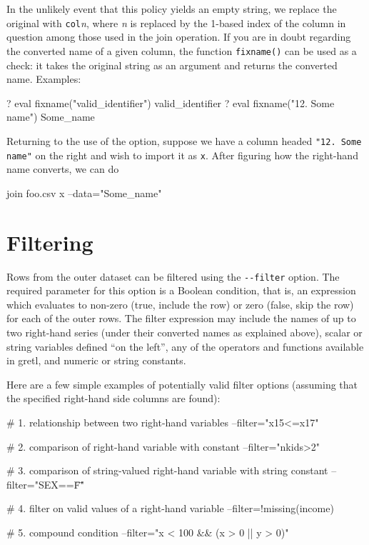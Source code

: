 In the unlikely event that this policy yields an empty string, we
replace the original with \texttt{col}\textsl{n}, where \textsl{n} is
replaced by the 1-based index of the column in question among those
used in the join operation. If you are in doubt regarding the
converted name of a given column, the function \texttt{fixname()} can
be used as a check: it takes the original string as an argument and
returns the converted name. Examples:

\begin{code}
? eval fixname("valid_identifier")
valid_identifier
? eval fixname("12. Some name")
Some_name
\end{code}

Returning to the use of the  option, suppose we have a
column headed \verb|"12. Some name"| on the right and wish to import
it as \texttt{x}. After figuring how the right-hand name converts, we
can do
%
\begin{code}
join foo.csv x --data="Some_name"
\end{code}

\section{Filtering}

Rows from the outer dataset can be filtered using the \verb|--filter|
option. The required parameter for this option is a Boolean condition,
that is, an expression which evaluates to non-zero (true, include the
row) or zero (false, skip the row) for each of the outer rows. The
filter expression may include the names of up to two right-hand
series (under their converted names as explained above), scalar or
string variables defined ``on the left'', any of the operators and
functions available in gretl, and numeric or string constants.

Here are a few simple examples of potentially valid filter options
(assuming that the specified right-hand side columns are found):

\begin{code}
# 1. relationship between two right-hand variables
--filter="x15<=x17"

# 2. comparison of right-hand variable with constant
--filter="nkids>2"

# 3. comparison of string-valued right-hand variable with string constant
--filter="SEX==\"F\""

# 4. filter on valid values of a right-hand variable
--filter=!missing(income)

# 5. compound condition
--filter="x < 100 && (x > 0 || y > 0)"
\end{code}


